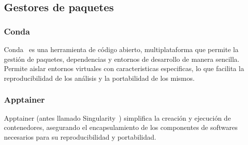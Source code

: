 \subsection{Gestores de paquetes}
\subsubsection{Conda}
Conda~\cite{anaconda}  es una herramienta de código abierto, multiplataforma  que permite la gestión de paquetes, dependencias y entornos de desarrollo de manera sencilla. Permite aislar entornos virtuales con caracteristicas especificas, lo que facilita la reproducibilidad de los análisis y la portabilidad de los mismos.
\subsubsection{Apptainer}
Apptainer (antes llamado Singularity~\cite{kurtzer2017singularity}) simplifica la creación y ejecución de contenedores, asegurando el encapsulamiento de los componentes de softwares necesarios para su reproducibilidad y portabilidad.  

